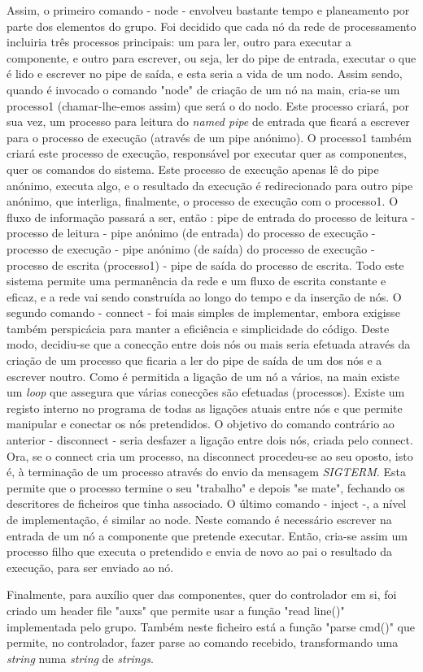 \documentclass[a4paper]{article}
\begin{document}
Assim, o primeiro comando - node - envolveu bastante tempo e planeamento por parte dos elementos do grupo. Foi decidido que cada nó da rede de processamento incluiria três processos principais: um para ler, outro para executar a componente, e outro para escrever, ou seja, ler do pipe de entrada, executar o que é lido e escrever no pipe de saída, e esta seria a vida de um nodo. Assim sendo, quando é invocado o comando "node" de criação de um nó na main, cria-se um processo1 (chamar-lhe-emos assim) que será o do nodo. Este processo criará, por sua vez, um processo para leitura do \emph{named pipe} de entrada que ficará a escrever para o processo de execução (através de um pipe anónimo). O processo1 também criará este processo de execução, responsável por executar quer as componentes, quer os comandos do sistema. Este processo de execução apenas lê do pipe anónimo, executa algo, e o resultado da execução é redirecionado para outro pipe anónimo, que interliga, finalmente, o processo de execução com o processo1.
O fluxo de informação passará a ser, então : pipe de entrada do processo de leitura - processo de leitura - pipe anónimo (de entrada) do processo de execução - processo de execução - pipe anónimo (de saída) do processo de execução - processo de escrita (processo1) - pipe de saída do processo de escrita. Todo este sistema permite uma permanência da rede e um fluxo de escrita constante e eficaz, e a rede vai sendo construída ao longo do tempo e da inserção de nós.
O segundo comando - connect - foi mais simples de implementar, embora exigisse também perspicácia para manter a eficiência e simplicidade do código. Deste modo, decidiu-se que a conecção entre dois nós ou mais seria efetuada através da criação de um processo que ficaria a ler do pipe de saída de um dos nós e a escrever noutro. Como é permitida a ligação de um nó a vários, na main existe um \emph{loop} que assegura que várias conecções são efetuadas (processos). Existe um registo interno no programa de todas as ligações atuais entre nós e que permite manipular e conectar os nós pretendidos.
O objetivo do comando contrário ao anterior - disconnect - seria desfazer a ligação entre dois nós, criada pelo connect. Ora, se o connect cria um processo, na disconnect procedeu-se ao seu oposto, isto é, à terminação de um processo através do envio da mensagem \emph{SIGTERM}. Esta  permite que o processo termine o seu "trabalho" e depois "se mate", fechando os descritores de ficheiros que tinha associado.
O último comando - inject -, a nível de implementação, é similar ao node. Neste comando é necessário escrever na entrada de um nó a componente que pretende executar. Então, cria-se assim um processo filho que executa o pretendido e envia de novo ao pai o resultado da execução, para ser enviado ao nó.
\par Finalmente, para auxílio quer das componentes, quer do controlador em si, foi criado um header file "auxs" que permite usar a função "read line()" implementada pelo grupo. Também neste ficheiro está a função "parse cmd()" que permite, no controlador, fazer parse ao comando recebido, transformando uma \emph{string} numa \emph{string} de \emph{strings}.
\end{document}
